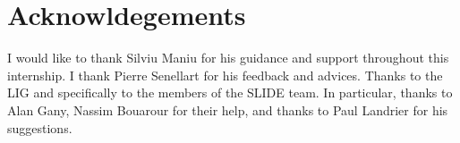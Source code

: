 \documentclass{../cs-classes/cs-classes}
\newcommand*{\1}{\digitsbb{1}}
\newcommand*{\0}{\digitsbb{0}}
\begin{document}
\section*{Acknowldegements}
I would like to thank Silviu Maniu for his guidance and support throughout this internship. I thank Pierre Senellart for his feedback and advices. Thanks to the LIG and specifically to the members of the SLIDE team. In particular, thanks to Alan Gany, Nassim Bouarour for their help, and thanks to Paul Landrier for his suggestions.

\nocite{*}
\printbibliography

\newpage
\appendix
\end{document}
